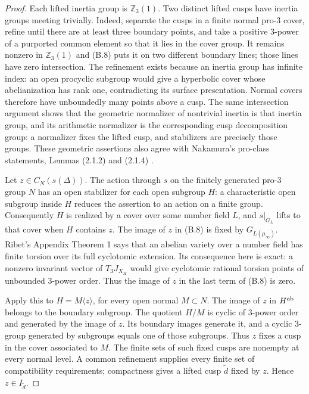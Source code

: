 \begin{proof}
Each lifted inertia group is $\mathbb Z_3(1)$.  Two distinct
lifted cusps have inertia groups meeting trivially.  Indeed,
separate the cusps in a finite normal pro-$3$ cover, refine
until there are at least three boundary points, and take a
positive $3$-power of a purported common element so that it
lies in the cover group.  It remains nonzero in
$\mathbb Z_3(1)$ and (B.8) puts it on two different boundary
lines; those lines have zero intersection.  The refinement
exists because an inertia group has infinite index: an open
procyclic subgroup would give a hyperbolic cover whose
abelianization has rank one, contradicting its surface
presentation.  Normal covers therefore have unboundedly
many points above a cusp.  The same intersection argument
shows that the geometric normalizer of nontrivial inertia is
that inertia group, and its arithmetic normalizer is the
corresponding cusp decomposition group: a normalizer fixes
the lifted cusp, and stabilizers are precisely those groups.
These geometric assertions also agree with Nakamura's
pro-class statements, Lemmas (2.1.2) and (2.1.4)
\cite{BC_Nakamura1994}.

Let $z\in C_N(s(\Delta))$.  The action through $s$ on the
finitely generated pro-$3$ group $N$ has an open stabilizer
for each open subgroup $H$: a characteristic open subgroup
inside $H$ reduces the assertion to an action on a finite
group.  Consequently $H$ is realized by a cover over some
number field $L$, and $s|_{G_L}$ lifts to that cover when
$H$ contains $z$.  The image of $z$ in (B.8) is fixed by
$G_{L(\mu_\infty)}$.
Ribet's Appendix Theorem 1 \cite{BC_Ribet1981} says that
an abelian variety over a number field has finite torsion
over its full cyclotomic extension.  Its consequence here
is exact: a nonzero invariant vector of $T_3J_{X_H}$ would
give cyclotomic rational torsion points of unbounded
$3$-power order.  Thus the image of $z$ in the last term
of (B.8) is zero.

Apply this to $H=M\langle z\rangle$, for every open normal
$M\subset N$.  The image of $z$ in $H^{\rm ab}$ belongs
to the boundary subgroup.  The quotient $H/M$ is cyclic of
$3$-power order and generated by the image of $z$.
Its boundary images generate it, and a cyclic $3$-group
generated by subgroups equals one of those subgroups.
Thus $z$ fixes a cusp in the cover associated to $M$.
The finite sets of such fixed cusps are nonempty at every
normal level.  A common refinement supplies every finite
set of compatibility requirements; compactness gives a
lifted cusp $\widetilde d$ fixed by $z$.  Hence
$z\in I_{\widetilde d}$.


\end{proof}
